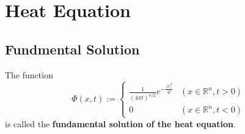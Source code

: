 \chapter{Heat Equation}%
\section{Fundmental Solution}
\begin{definition}
    The function
    \begin{equation*}
        \Phi(x, t):= \begin{cases}\frac{1}{(4 \pi t)^{n / 2}} e^{-\frac{|x|^2}{4 t}} & \left(x \in \mathbb{R}^n, t>0\right) \\ 0 & \left(x \in \mathbb{R}^n, t<0\right)\end{cases}
    \end{equation*}
    is called the \textbf{fundamental solution of the heat equation}.
\end{definition}
